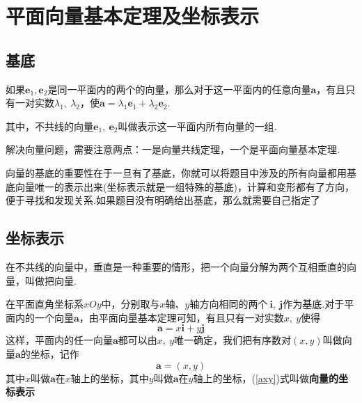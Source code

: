 \documentclass{BHCexam}
\begin{document}
\section{平面向量基本定理及坐标表示}
\subsection{基底}
\begin{Theroem}[平面向量基本定理]
如果$ \bm{e}_1,\bm{e}_2 $是同一平面内的两个的向量，那么对于这一平面内的任意向量$ \bm{a} $，有且只有一对实数$ \lambda_1,~\lambda_2 $，使$\bm{a}=\lambda_1\bm{e}_1+\lambda_2\bm{e}_2$.\par 其中，不共线的向量$ \bm{e}_1,~\bm{e}_2 $叫做表示这一平面内所有向量的一组.
\end{Theroem}
{\kaishu 解决向量问题，需要注意两点：一是向量共线定理，一个是平面向量基本定理.\par
向量的基底的重要性在于一旦有了基底，你就可以将题目中涉及的所有向量都用基底向量唯一的表示出来(坐标表示就是一组特殊的基底)，计算和变形都有了方向，便于寻找和发现关系.如果题目没有明确给出基底，那么就需要自己指定了}

\subsection{坐标表示}
在不共线的向量中，垂直是一种重要的情形，把一个向量分解为两个互相垂直的向量，叫做把向量.\par
在平面直角坐标系$xOy$中，分别取与$x$轴、$y$轴方向相同的两个$~ \bm{i},~\bm{j} $作为基底.对于平面内的一个向量$ \bm{a} $，由平面向量基本定理可知，有且只有一对实数$ x,~y $使得\[\bm{a}=x\bm{i}+y\bm{j}\]
这样，平面内的任一向量$ \bm{a} $都可以由$ x,~y $唯一确定，我们把有序数对$ (x,y) $叫做向量$\bm{a}  $的坐标，记作\begin{equation}\label{axy}
\bm{a}=(x,y)
\end{equation}其中$ x $叫做$ \bm{a} $在$x$轴上的坐标，其中$ y $叫做$ \bm{a} $在$y$轴上的坐标，(\ref{axy})式叫做\textbf{向量的坐标表示}
\begin{center}
\end{center}
\end{document}
